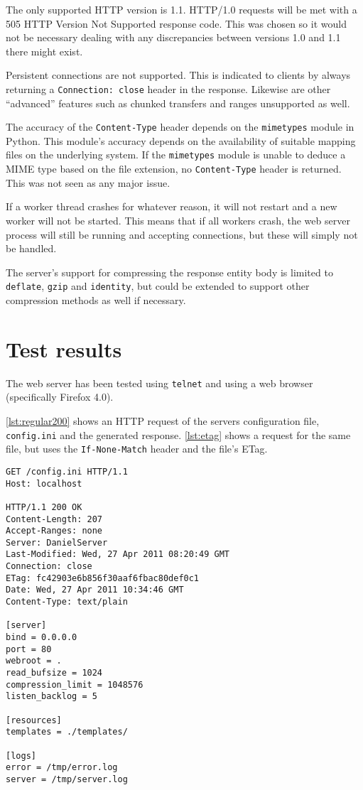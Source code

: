 \documentclass{sig-alternate}
\begin{document}
The only supported HTTP version is 1.1. HTTP/1.0 requests will be met with
a 505 HTTP Version Not Supported response code. This was chosen so it would
not be necessary dealing with any discrepancies between versions 1.0 and 1.1
there might exist.

Persistent connections are not supported. This is indicated to clients
by always returning a \verb+Connection: close+ header in the response.
Likewise are other ``advanced'' features such as chunked transfers and ranges
unsupported as well.

The accuracy of the \verb+Content-Type+ header depends on the \verb+mimetypes+
module in Python. This module's accuracy depends on the availability of
suitable mapping files on the underlying system. If the \verb+mimetypes+
module is unable to deduce a MIME type based on the file extension, no
\verb+Content-Type+ header is returned. This was not seen as any major issue.

If a worker thread crashes for whatever reason, it will not restart and a
new worker will not be started. This means that if all workers crash,
the web server process will still be running and accepting connections,
but these will simply not be handled.

The server's support for compressing the response entity body is limited to
\verb+deflate+, \verb+gzip+ and \verb+identity+, but could be extended to
support other compression methods as well if necessary.


\section{Test results}

The web server has been tested using \verb+telnet+ and using a web browser
(specifically Firefox 4.0).

\autoref{lst:regular200} shows an HTTP request of the servers configuration
file, \verb+config.ini+ and the generated response. \autoref{lst:etag} shows a
request for the same file, but uses the \verb+If-None-Match+ header and the
file's ETag.

\begin{lstlisting}
GET /config.ini HTTP/1.1
Host: localhost

HTTP/1.1 200 OK
Content-Length: 207
Accept-Ranges: none
Server: DanielServer
Last-Modified: Wed, 27 Apr 2011 08:20:49 GMT
Connection: close
ETag: fc42903e6b856f30aaf6fbac80def0c1
Date: Wed, 27 Apr 2011 10:34:46 GMT
Content-Type: text/plain

[server]
bind = 0.0.0.0
port = 80
webroot = .
read_bufsize = 1024
compression_limit = 1048576
listen_backlog = 5

[resources]
templates = ./templates/

[logs]
error = /tmp/error.log
server = /tmp/server.log
\end{lstlisting}
\end{document}
